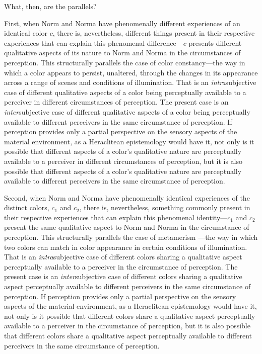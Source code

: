 \documentclass[12pt]{article}
\begin{document}
What, then, are the parallels?

First, when Norm and Norma have phenomenally different experiences of an identical color \( c \), there is, nevertheless, different things present in their respective experiences that can explain this phenomenal difference---\( c \) presents different qualitative aspects of its nature to Norm and Norma in the circumstances of perception. This structurally parallels the case of color constancy---the way in which a color appears to persist, unaltered, through the changes in its appearance across a range of scenes and conditions of illumination. That is an \emph{intra}subjective case of different qualitative aspects of a color being perceptually available to a perceiver in different circumstances of perception. The present case is an \emph{inter}subjective case of different qualitative aspects of a color being perceptually available to different perceivers in the same circumstance of perception. If perception provides only a partial perspective on the sensory aspects of the material environment, as a Heraclitean epistemology would have it, not only is it possible that different aspects of a color's qualitative nature are perceptually available to a perceiver in different circumstances of perception, but it is also possible that different aspects of a color's qualitative nature are perceptually available to different perceivers in the same circumstance of perception.

Second, when Norm and Norma have phenomenally identical experiences of the distinct colors, \( c_1 \) and \( c_2 \), there is, nevertheless, something commonly present in their respective experiences that can explain this phenomenal identi\-ty---\( c_1 \) and \( c_2 \) present the same qualitative aspect to Norm and Norma in the circumstance of perception. This structurally parallels the case of metamerism ---the way in which two colors can match in color appearance in certain conditions of illumination. That is an \emph{intra}subjective case of different colors sharing a qualitative aspect perceptually available to a perceiver in the circumstance of perception. The present case is an \emph{inter}subjective case of different colors sharing a qualitative aspect perceptually available to different perceivers in the same circumstance of perception. If perception provides only a partial perspective on the sensory aspects of the material environment, as a Heraclitean epistemology would have it, not only is it possible that different colors share a qualitative aspect perceptually available to a perceiver in the circumstance of perception, but it is also possible that different colors share a qualitative aspect perceptually available to different perceivers in the same circumstance of perception.
\end{document}
